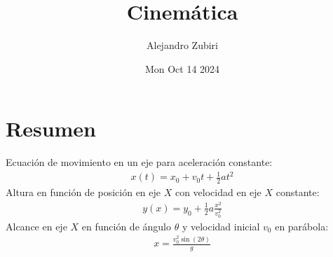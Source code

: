 \documentclass{article}
\author{Alejandro Zubiri}
\date{Mon Oct 14 2024}
\title{Cinemática}
\begin{document}
\maketitle
\section{Resumen}
Ecuación de movimiento en un eje para aceleración constante:
\begin{equation}
    \begin{split}
        x(t)=x_{0}+v_{0}t+\frac{1}{2}at^{2}
    \end{split}
\end{equation}
Altura en función de posición en eje $X$ con velocidad en eje $X$ constante:
\begin{equation}
    \begin{split}
        y(x)=y_{0}+\frac{1}{2}a \frac{x^{2}}{v_{0}^{2}}
    \end{split}
\end{equation}
Alcance en eje $X$ en función de ángulo $\theta $ y velocidad inicial $v_{0}$ en parábola:
\begin{equation}
    \begin{split}
        x= \frac{v_{0}^{2}\sin(2 \theta)}{g}
    \end{split}
\end{equation}
\end{document}
